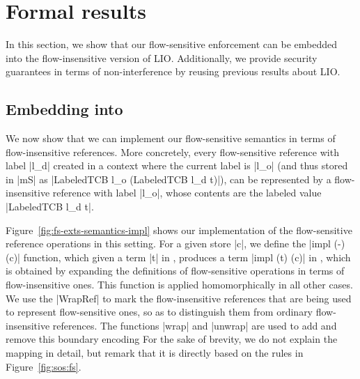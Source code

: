 \section{Formal results}
\label{sec:soundness}

In this section, we show that our flow-sensitive enforcement can be
embedded into the flow-insensitive version of LIO. Additionally, we
provide security guarantees in terms of non-interference by reusing
previous results about LIO.

\subsection{Embedding into \lio{}}

We now show that we can implement our flow-sensitive semantics in terms of
flow-insensitive references. More concretely, every flow-sensitive reference
with label |l_d| created in a context where the current label is |l_o| (and
thus stored in |mS| as |LabeledTCB l_o (LabeledTCB l_d t)|), can be represented
by a flow-insensitive reference with label |l_o|, whose contents are the
labeled value |LabeledTCB l_d t|.

Figure~\ref{fig:fs-exts-semantics-impl} shows our implementation of
the flow-sensitive reference operations in this setting.  For a given
store |c|, we define the |impl (-) (c)| function, which given a term
|t| in \liofs{}, produces a term |impl (t) (c)| in \lio{}, which is
obtained by expanding the definitions of flow-sensitive operations in
terms of flow-insensitive ones. This function is applied
homomorphically in all other cases. We use the |WrapRef| to mark
the flow-insensitive references that are being used to represent
flow-sensitive ones, so as to distinguish them from ordinary
flow-insensitive references. The functions |wrap| and |unwrap| are
used to add and remove this boundary encoding
%
For the sake of brevity, we do not explain the mapping in detail, but remark
that it is directly based on the rules in Figure~\ref{fig:sos:fs}.
%

